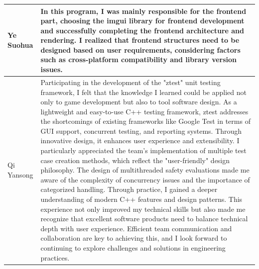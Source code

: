 \documentclass{article}
\begin{document}
\begin{tabular}{|p{50pt}|p{350pt}|}
    Ye Suohua      & In this program, I was mainly responsible for the frontend part, choosing the imgui library for frontend development and successfully completing the frontend architecture and rendering. I realized that frontend structures need to be designed based on user requirements, considering factors such as cross-platform compatibility and library version issues.                                                                                                                                                                                                                                                                                                                                                                                                                                                                                                                                                                                                                                                                                                                                                                                                                                                           \\ \hline
    Qi Yansong     & Participating in the development of the "ztest" unit testing framework, I felt that the knowledge I learned could be applied not only to game development but also to tool software design. As a lightweight and easy-to-use C++ testing framework, ztest addresses the shortcomings of existing frameworks like Google Test in terms of GUI support, concurrent testing, and reporting systems. Through innovative design, it enhances user experience and extensibility. I particularly appreciated the team's implementation of multiple test case creation methods, which reflect the "user-friendly" design philosophy. The design of multithreaded safety evaluations made me aware of the complexity of concurrency issues and the importance of categorized handling. Through practice, I gained a deeper understanding of modern C++ features and design patterns. This experience not only improved my technical skills but also made me recognize that excellent software products need to balance technical depth with user experience. Efficient team communication and collaboration are key to achieving this, and I look forward to continuing to explore challenges and solutions in engineering practices. \\ \hline

\end{tabular}
\end{document}
